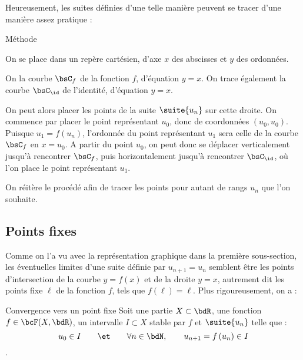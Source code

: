 \documentclass[a4paper,french,bookmarks]{article}
\begin{document}
%
\hfill
%
\begin{minipage}{0.35\linewidth}
\end{minipage}

Heureusement, les suites définies d'une telle manière peuvent se tracer d'une manière assez pratique :

\begin{form}{Méthode}{}
        \begin{enumerate}
            \ithand On se place dans un repère cartésien, d'axe $x$ des abscisses et $y$ des ordonnées.
        
            \ithand On la courbe $\bsC_f$ de la fonction $f$, d'équation $y = x$. On trace également la courbe $\bsC_{\id}$ de l'identité, d'équation $y = x$.
            
            \ithand On peut alors placer les points de la suite $\suite{u_n}$ sur cette droite. On commence par placer le point représentant $u_0$, donc de coordonnées $(u_0, u_0)$. Puisque $u_1 = f(u_n)$, l'ordonnée du point représentant $u_1$ sera celle de la courbe $\bsC_f$ en $x = u_0$. A partir du point $u_0$, on peut donc se déplacer verticalement jusqu'à rencontrer $\bsC_f$, puis horizontalement jusqu'à rencontrer $\bsC_{\id}$, où l'on place le point représentant $u_1$.
            
            \ithand On réitère le procédé afin de tracer les points pour autant de rangs $u_n$ que l'on souhaite.
        \end{enumerate}
\end{form}

\subsection{Points fixes}

Comme on l'a vu avec la représentation graphique dans la première sous-section, les éventuelles limites d'une suite définie par $u_{n+1} = u_n$ semblent être les points d'intersection de la courbe $y = f(x)$ et de la droite $y = x$, autrement dit les points fixe $\ell$ de la fonction $f$, tels que $f(\ell) = \ell$. Plus rigoureusement, on a :

\begin{property}{Convergence vers un point fixe}{}
    Soit une partie $X \subset \bdR$, une fonction $f \in \bcF(X, \bdR)$, un intervalle $I \subset X$ stable par $f$ et $\suite{u_n}$ telle que :
    \[ u_0 \in I \qquad\et\qquad \forall n \in \bdN,\qquad u_{n+1} = f\left(u_n\right) \in I\]
    .
\end{property}
\end{document}
